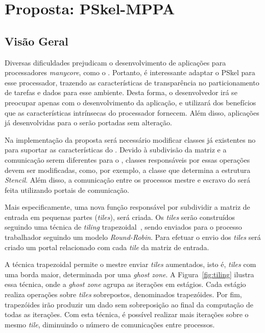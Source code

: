 \chapter{Proposta: PSkel-MPPA}
\label{cha:proposta}

\section{Visão Geral}

Diversas dificuldades prejudicam o desenvolvimento de aplicações para
processadores \textit{manycore}, como o \mppa. Portanto, é interessante adaptar
o \fw PSkel para esse processador, trazendo as características de transparência
no particionamento de tarefas e dados para esse ambiente. Desta forma, o
desenvolvedor irá se preocupar apenas com o desenvolvimento da aplicação, e
utilizará dos benefícios que as características intrínsecas do processador
fornecem. Além disso, aplicações já desenvolvidas para o \fw serão portadas sem
alteração.


Na implementação da proposta será necessário modificar classes já existentes
no \fw para suportar as características do \mppa. Devido à subdivisão da matriz
e a comunicação serem diferentes para o \mppa, classes responsáveis por essas
operações devem ser modificadas, como, por exemplo, a classe que determina a estrutura
\textit{Stencil}. Além disso, a comunicação entre os processos mestre e escravo
do \mppa será feita utilizando portais de comunicação.

Mais especificamente, uma nova função responsável por subdividir a matriz
de entrada em pequenas partes (\textit{tiles}), será criada.
Os \textit{tiles} serão construídos seguindo uma técnica de \textit{tiling}
trapezoidal~\cite{meng11}, sendo enviados para o processo trabalhador seguindo um modelo \textit{Round-Robin}.
Para efetuar o envio dos \textit{tiles} será criado um portal relacionado com
cada \textit{tile} da matriz de entrada.

A técnica trapezoidal permite o mestre enviar \textit{tiles} aumentados, isto é,
\textit{tiles} com uma borda maior, determinada por uma \textit{ghost zone}.
A Figura~\ref{fig:tiling} ilustra essa técnica, onde a \textit{ghost zone}
agrupa as iterações em estágios. Cada estágio realiza
operações sobre \textit{tiles} sobrepostos, denominados trapezóides.
Por fim, trapezóides irão produzir um dado sem sobreposição ao final da
computação de todas as iterações.
Com esta técnica, é possível realizar mais iterações sobre o mesmo
\textit{tile}, diminuindo o número de comunicações entre processos.

